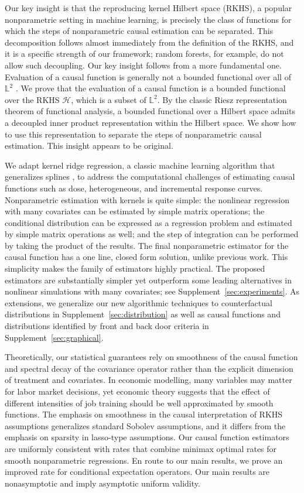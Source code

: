 Our key insight is that the reproducing kernel Hilbert space (RKHS), a popular nonparametric setting in machine learning, is precisely the class of functions for which the steps of nonparametric causal estimation can be separated. This decomposition follows almost immediately from the definition of the RKHS, and it is a specific strength of our framework; random forests, for example, do not allow such decoupling. Our key insight follows from a more fundamental one. Evaluation of a causal function is generally not a bounded functional over all of $\mathbb{L}^2$ \cite{van1991differentiable,newey1994asymptotic}. We prove that the evaluation of a causal function is a bounded functional over the RKHS $\mathcal{H}$, which is a subset of $\mathbb{L}^2$. By the classic Riesz representation theorem of functional analysis, a bounded functional over a Hilbert space admits a decoupled inner product representation within the Hilbert space. We show how to use this representation to separate the steps of nonparametric causal estimation. This insight appears to be original.

We adapt kernel ridge regression, a classic machine learning algorithm that generalizes splines \cite{wahba1990spline}, to address the computational challenges of estimating causal functions such as dose, heterogeneous, and incremental response curves. Nonparametric estimation with kernels is quite simple: the nonlinear regression with many covariates can be estimated by simple matrix operations; the conditional distribution can be expressed as a regression problem and estimated by simple matrix operations as well; and the step of integration can be performed by taking the product of the results. The final nonparametric estimator for the causal function has a one line, closed form solution, unlike previous work. This simplicity makes the family of estimators highly practical. The proposed estimators are substantially simpler yet outperform some leading alternatives in nonlinear simulations with many covariates; see Supplement~\ref{sec:experiments}. As extensions, we generalize our new algorithmic techniques to counterfactual distributions in Supplement~\ref{sec:distribution} as well as causal functions and distributions identified by front and back door criteria in Supplement~\ref{sec:graphical}.

Theoretically, our statistical guarantees rely on smoothness of the causal function and spectral decay of the covariance operator rather than the explicit dimension of treatment and covariates. In economic modelling, many variables may matter for labor market decisions, yet economic theory suggests that the effect of different intensities of job training should be well approximated by smooth functions. The emphasis on smoothness in the causal interpretation of RKHS assumptions generalizes standard Sobolev assumptions, and it differs from the emphasis on sparsity in lasso-type assumptions. Our causal function estimators are uniformly consistent with rates that combine minimax optimal rates for smooth nonparametric regressions. En route to our main results, we prove an improved rate for conditional expectation operators. Our main results are nonasymptotic and imply asymptotic uniform validity.%

